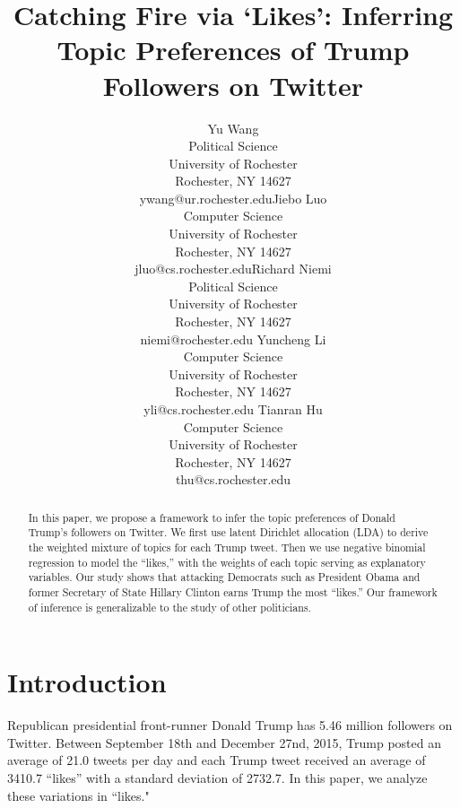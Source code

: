 \documentclass[letterpaper]{article}
\title{\TitleFont Catching Fire via `Likes': Inferring Topic Preferences of Trump Followers on Twitter}
\begin{document}
\author{Yu Wang\\Political Science\\University of Rochester\\Rochester, NY 14627\\ywang@ur.rochester.edu\And Jiebo Luo\\Computer Science\\University of Rochester\\Rochester, NY 14627\\jluo@cs.rochester.edu\And Richard Niemi\\Political Science\\University of Rochester\\Rochester, NY 14627\\niemi@rochester.edu \And Yuncheng Li\\Computer Science\\University of Rochester\\Rochester, NY 14627\\yli@cs.rochester.edu \And Tianran Hu\\Computer Science\\University of Rochester\\Rochester, NY 14627\\thu@cs.rochester.edu}


\maketitle

\begin{abstract} \small\baselineskip=9pt
In this paper, we propose a framework to infer the topic preferences of Donald Trump's followers on Twitter. We first use latent Dirichlet allocation (LDA) to derive the weighted mixture of topics for each Trump tweet. Then we use negative binomial regression to model the ``likes,'' with the weights of each topic serving as explanatory variables. Our study shows that attacking Democrats such as President Obama and former Secretary of State Hillary Clinton earns Trump the most ``likes.'' Our framework of inference is generalizable to the study of other politicians.

\end{abstract}

\section{Introduction}
Republican presidential front-runner Donald Trump has 5.46 million followers on Twitter. Between September 18th and December 27nd, 2015, Trump posted an average of 21.0 tweets per day and each Trump tweet received an average of 3410.7 ``likes'' with a standard deviation of 2732.7. In this paper, we analyze these variations in ``likes."
\end{document}
